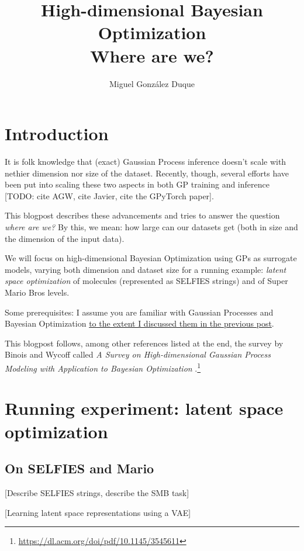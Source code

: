 \documentclass{article}
\title{High-dimensional Bayesian Optimization \\ Where are we?}
\author{Miguel González Duque}
\date{}
\begin{document}
\maketitle

\section*{Introduction}

It is folk knowledge that (exact) Gaussian Process inference doesn't scale with nethier dimension nor size of the dataset. Recently, though, several efforts have been put into scaling these two aspects in both GP training and inference [TODO: cite AGW, cite Javier, cite the GPyTorch paper].

This blogpost describes these advancements and tries to answer the question \textit{where are we?} By this, we mean: how large can our datasets get (both in size and the dimension of the input data).

We will focus on high-dimensional Bayesian Optimization using GPs as surrogate models, varying both dimension and dataset size for a running example: \textit{latent space optimization} of molecules (represented as SELFIES strings) and of Super Mario Bros levels.

Some prerequisites: I assume you are familiar with Gaussian Processes and Bayesian Optimization \href{https://www.miguelgondu.com/blogposts/2023-07-31/intro-to-bo/}{to the extent I discussed them in the previous post}.

This blogpost follows, among other references listed at the end, the survey by Binois and Wycoff called \textit{A Survey on High-dimensional Gaussian Process Modeling with Application to Bayesian Optimization} \cite{BinoisWycoff:high-dimensional-bo:2022}.\footnote{\url{https://dl.acm.org/doi/pdf/10.1145/3545611}}

\section*{Running experiment: latent space optimization}

\subsection*{On SELFIES and Mario}

[Describe SELFIES strings, describe the SMB task]

[Learning latent space representations using a VAE]
\end{document}
